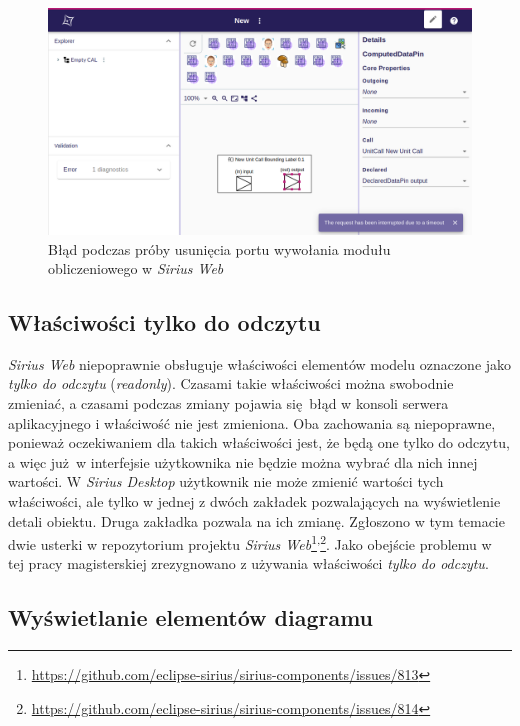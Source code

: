 \begin{figure}[!hb]
  \centering

  \includegraphics[width=0.95\linewidth]{./images/sirius-web-timeout-when-deleting-pins.png}
  \caption{Błąd podczas próby usunięcia portu wywołania modułu obliczeniowego w
    \emph{Sirius Web}}\label{rys:sirius-web-timeout-when-deleting-pins}
\end{figure}

\subsection{Właściwości tylko do odczytu}

\emph{Sirius Web} niepoprawnie obsługuje właściwości elementów modelu oznaczone
jako
\emph{tylko do odczytu} (\emph{readonly}). Czasami takie właściwości można
swobodnie zmieniać, a czasami podczas zmiany pojawia się błąd w konsoli serwera
aplikacyjnego i właściwość nie jest zmieniona. Oba zachowania są niepoprawne,
ponieważ oczekiwaniem dla takich właściwości jest, że będą one tylko do
odczytu, a więc już w interfejsie użytkownika nie będzie można wybrać dla nich
innej wartości. W \emph{Sirius Desktop} użytkownik nie może zmienić wartości
tych właściwości, ale tylko w jednej z dwóch zakładek pozwalających na
wyświetlenie detali obiektu. Druga zakładka pozwala na ich zmianę.
Zgłoszono w tym temacie dwie usterki w repozytorium
projektu \emph{Sirius Web}\footnote{
	\url{https://github.com/eclipse-sirius/sirius-components/issues/813}
}\textsuperscript{,}\footnote{
	\url{https://github.com/eclipse-sirius/sirius-components/issues/814}
}. Jako obejście problemu w tej pracy magisterskiej zrezygnowano z używania
właściwości \emph{tylko do odczytu}.

\subsection{Wyświetlanie elementów diagramu}

